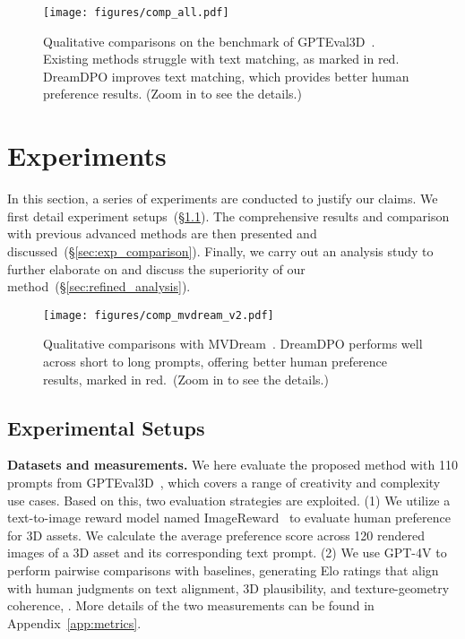 \begin{figure*}[t]
    \centering
    \texttt{[image: figures/comp\_all.pdf]}
    \caption{
    Qualitative comparisons on the benchmark of GPTEval3D~\protect\citep{wu2024gpt}.
    Existing methods struggle with text matching, as marked in red.
    DreamDPO improves text matching, which provides better human preference results.
    (Zoom in to see the details.)
    }
    \label{fig:quan_comp_all}
\end{figure*}

\section{Experiments}
\label{sec:exp}
In this section, a series of experiments are conducted to justify our claims. We first detail experiment setups~(\S\ref{sec:exp_setups}). The comprehensive results and comparison with previous advanced methods are then presented and discussed~(\S\ref{sec:exp_comparison}). Finally, we carry out an analysis study to further elaborate on and discuss the superiority of our method~(\S\ref{sec:refined_analysis}).

\begin{figure}[t]
    \centering
    \texttt{[image: figures/comp\_mvdream\_v2.pdf]}
    \caption{
    Qualitative comparisons with MVDream~\protect\citep{shi2023mvdream}. 
    DreamDPO performs well across short to long prompts, offering better human preference results, marked in red.~(Zoom in to see the details.)
    }
    \label{fig:quan_comp_backbone}
\end{figure}


\subsection{Experimental Setups}\label{sec:exp_setups}

\textbf{Datasets and measurements.} We here evaluate the proposed method with 110 prompts from GPTEval3D~\citep{wu2024gpt}, which covers a range of creativity and complexity use cases. Based on this, two evaluation strategies are exploited. 
(1) We utilize a text-to-image reward model named ImageReward~\citep{xu2024imagereward} to evaluate human preference for 3D assets.
We calculate the average preference score across 120 rendered images of a 3D asset and its corresponding text prompt.
(2) We use GPT-4V to perform pairwise comparisons with baselines, generating Elo ratings that align with human judgments on text alignment, 3D plausibility, and texture-geometry coherence, \etc. More details of the two measurements can be found in Appendix~\ref{app:metrics}.


